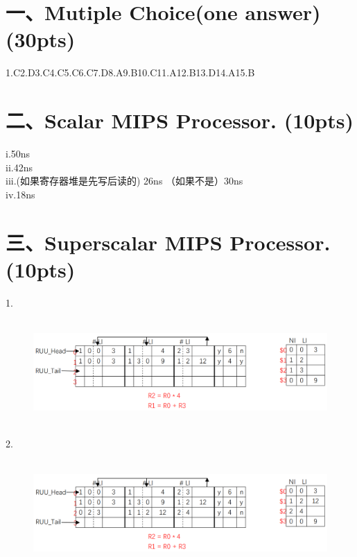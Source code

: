\documentclass[UTF8]{ctexart}
\begin{document}
\newpage
\section*{一、Mutiple Choice(one answer)(30pts)}
1.C\quad 2.D\quad 3.C\quad 4.C\quad 5.C\quad 6.C\quad 7.D\quad 8.A\quad 9.B\quad 10.C\quad 11.A\quad 12.B\quad 13.D\quad 14.A\quad 15.B\quad

\section*{二、Scalar MIPS Processor. (10pts)}
i.\quad 50ns\\
ii.\quad 42ns\\
iii.\quad (如果寄存器堆是先写后读的) 26ns （如果不是）30ns\\
iv.\quad 18ns

\section*{三、Superscalar MIPS Processor. (10pts)}
1.
\begin{figure}[H]                                            
    \centering                                                
    \includegraphics[width=14cm,height=4cm]{3-1-ans.png}        
    \caption*{}                                                                                 
\end{figure}  
2.
\begin{figure}[H]                                            
    \centering                                                
    \includegraphics[width=14cm,height=4cm]{3-2-ans.png}        
    \caption*{}                                                                                 
\end{figure}  
\end{document}
